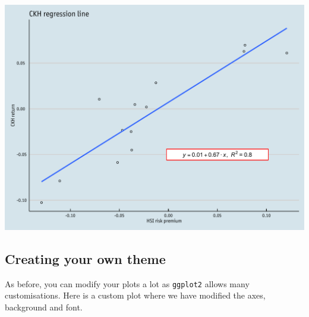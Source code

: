 \begin{Shaded}
\begin{Highlighting}[]
\StringTok{        }\NormalTok{(}\NormalTok{, } \NormalTok{),}
\StringTok{        } \NormalTok{(} \NormalTok{), }
\StringTok{        } \NormalTok{(), }
\StringTok{        } \NormalTok{(), } \NormalTok{(),}
\StringTok{        } \NormalTok{(} \NormalTok{),}
\StringTok{        }\NormalTok{(}\NormalTok{))}
\end{Highlighting}
\end{Shaded}

\begin{center}\includegraphics[width=0.55\linewidth]{figures/lr_16-1} \end{center}

\subsection{Creating your own
theme}\label{creating-your-own-theme-10}

As before, you can modify your plots a lot as \texttt{ggplot2} allows
many customisations. Here is a custom plot where we have modified the
axes, background and font.

